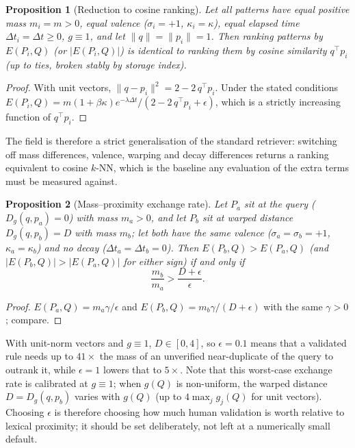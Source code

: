 \documentclass[11pt]{article}
\newtheorem{proposition}{Proposition}
\theoremstyle{remark}
\newcommand{\act}{E}
\newcommand{\dist}{D_g}
\begin{document}
\begin{proposition}[Reduction to cosine ranking]
\label{prop:cosine}
Let all patterns have equal positive mass $m_i=m>0$, equal valence ($\sigma_i=+1$, $\kappa_i=\kappa$), equal elapsed time $\Delta t_i=\Delta t\ge 0$, $g\equiv 1$, and let $\|q\|=\|p_i\|=1$. Then ranking patterns by $\act(P_i,Q)$ (or $|\act(P_i,Q)|$) is identical to ranking them by cosine similarity $q^{\top}p_i$ (up to ties, broken stably by storage index).
\end{proposition}
\begin{proof}
With unit vectors, $\|q-p_i\|^2 = 2 - 2\,q^{\top}p_i$. Under the stated conditions $\act(P_i,Q) = m(1+\beta\kappa)e^{-\lambda\Delta t}/(2-2\,q^{\top}p_i+\epsilon)$, which is a strictly increasing function of $q^{\top}p_i$.
\end{proof}

The field is therefore a strict generalisation of the standard retriever: switching off mass differences, valence, warping and decay differences returns a ranking equivalent to cosine $k$-NN, which is the baseline any evaluation of the extra terms must be measured against.

\begin{proposition}[Mass--proximity exchange rate]
\label{prop:exchange}
Let $P_a$ sit at the query ($\dist(q,p_a)=0$) with mass $m_a > 0$, and let $P_b$ sit at warped distance $\dist(q,p_b)=D$ with mass $m_b$; let both have the same valence ($\sigma_a=\sigma_b=+1$, $\kappa_a=\kappa_b$) and no decay ($\Delta t_a=\Delta t_b=0$). Then $\act(P_b,Q)>\act(P_a,Q)$ (and $|\act(P_b,Q)|>|\act(P_a,Q)|$ for either sign) if and only if
\begin{equation}
\label{eq:exchange}
\frac{m_b}{m_a} > \frac{D+\epsilon}{\epsilon} .
\end{equation}
\end{proposition}
\begin{proof}
$\act(P_a,Q)=m_a\gamma/\epsilon$ and $\act(P_b,Q)=m_b\gamma/(D+\epsilon)$ with the same $\gamma>0$; compare.
\end{proof}

With unit-norm vectors and $g\equiv 1$, $D\in[0,4]$, so $\epsilon=0.1$ means that a validated rule needs up to $41\times$ the mass of an unverified near-duplicate of the query to outrank it, while $\epsilon=1$ lowers that to $5\times$. Note that this worst-case exchange rate is calibrated at $g\equiv 1$; when $g(Q)$ is non-uniform, the warped distance $D = \dist(q,p_b)$ varies with $g(Q)$ (up to $4\max_j g_j(Q)$ for unit vectors). Choosing $\epsilon$ is therefore choosing how much human validation is worth relative to lexical proximity; it should be set deliberately, not left at a numerically small default.
\end{document}
